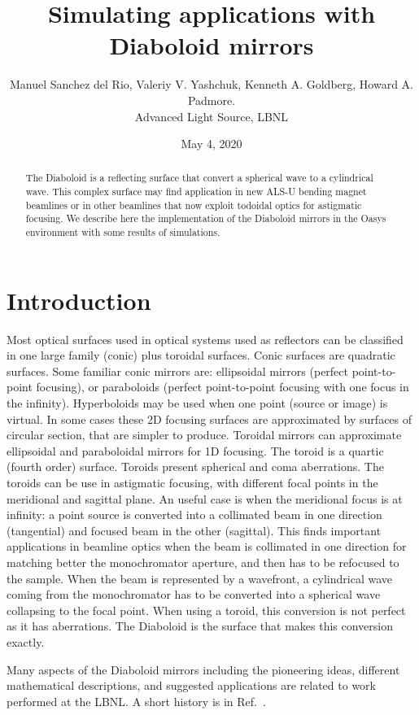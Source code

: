 \documentclass[a4paper, 11pt]{article}
\title{Simulating applications with Diaboloid mirrors}
\author{Manuel Sanchez del Rio, Valeriy V. Yashchuk,  Kenneth A. Goldberg, Howard A. Padmore.  \\ Advanced Light Source, LBNL}
\date{May 4, 2020}
\begin{document}
\maketitle

\begin{abstract}
The Diaboloid is a reflecting surface that convert a spherical wave to a cylindrical wave. This complex surface may find application in new ALS-U bending magnet beamlines or in other  beamlines that now exploit todoidal optics for astigmatic focusing. We describe here the implementation of the Diaboloid mirrors in the Oasys environment with some results of  simulations. 
\end{abstract}

\section{Introduction}

Most optical surfaces used in optical systems used as reflectors can be classified in one large family (conic) plus toroidal surfaces. Conic surfaces are quadratic surfaces. Some familiar conic mirrors are: ellipsoidal mirrors (perfect point-to-point focusing), or paraboloids (perfect point-to-point focusing with one focus in the infinity). Hyperboloids may be used when one point (source or image) is virtual. In some cases these 2D focusing surfaces are approximated by surfaces of circular section, that are simpler to produce. Toroidal mirrors can approximate ellipsoidal and paraboloidal mirrors for 1D focusing. The toroid is a quartic (fourth order) surface. Toroids present spherical and coma aberrations. The toroids can be use in astigmatic focusing, with different focal points in the meridional and sagittal plane. An useful case is when the meridional focus is at infinity: a point source is converted into a collimated beam in one direction (tangential) and focused beam in the other (sagittal). This finds important applications in beamline optics when the beam is collimated in one direction for matching better the monochromator aperture, and then has to be refocused to the sample. When the beam is represented by a wavefront, a cylindrical wave coming from the monochromator has to be converted into a spherical wave collapsing to the focal point. When using a toroid, this conversion is not perfect as it has aberrations. The Diaboloid is the surface that makes this conversion exactly. 

Many aspects of the Diaboloid mirrors including the pioneering ideas, different mathematical descriptions, and suggested applications are related to work performed at the LBNL. A short history is in Ref.~\cite{Goldberg2020}.
\end{document}
